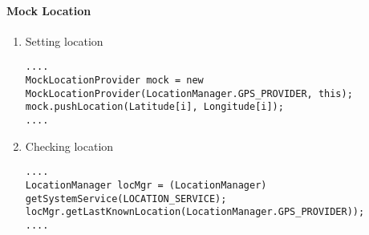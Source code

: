 \paragraph{Mock Location}
\begin{enumerate}
\item Setting location
\begin{lstlisting}
....
MockLocationProvider mock = new MockLocationProvider(LocationManager.GPS_PROVIDER, this);
mock.pushLocation(Latitude[i], Longitude[i]);
....
\end{lstlisting} 
\item Checking location
\begin{lstlisting}
....
LocationManager locMgr = (LocationManager) getSystemService(LOCATION_SERVICE);
locMgr.getLastKnownLocation(LocationManager.GPS_PROVIDER));
....
\end{lstlisting} 
\end{enumerate}

